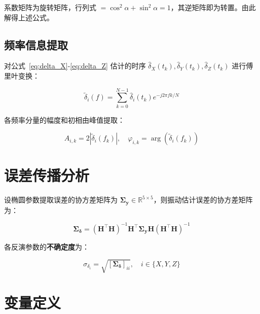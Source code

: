 \documentclass[12pt,a4paper]{article}
\begin{document}
系数矩阵为旋转矩阵，行列式 $= \cos^2\alpha + \sin^2\alpha = 1$，其逆矩阵即为转置。由此解得上述公式。

\subsection{频率信息提取}

对公式~\eqref{eq:delta_X}-\eqref{eq:delta_Z} 估计的时序 $\hat{\delta}_X(t_k), \hat{\delta}_Y(t_k), \hat{\delta}_Z(t_k)$ 进行傅里叶变换：

\begin{equation}
\tilde{\delta}_i(f) = \sum_{k=0}^{N-1} \hat{\delta}_i(t_k) e^{-j2\pi f k / N}
\label{eq:fourier_transform}
\end{equation}

各频率分量的幅度和初相由峰值提取：

\begin{equation}
A_{i,k} = 2|\tilde{\delta}_i(f_k)|, \quad
\varphi_{i,k} = \arg(\tilde{\delta}_i(f_k))
\label{eq:frequency_extraction}
\end{equation}

\section{误差传播分析}

设椭圆参数提取误差的协方差矩阵为 $\boldsymbol{\Sigma}_{\mathbf{y}} \in \mathbb{R}^{5 \times 5}$，则振动估计误差的协方差矩阵为：

\begin{equation}
\boldsymbol{\Sigma}_{\boldsymbol{\delta}} = (\mathbf{H}^{\top} \mathbf{H})^{-1} \mathbf{H}^{\top} \boldsymbol{\Sigma}_{\mathbf{y}} \mathbf{H} (\mathbf{H}^{\top} \mathbf{H})^{-1}
\label{eq:error_covariance}
\end{equation}

各反演参数的\textbf{不确定度}为：

\begin{equation}
\sigma_{\delta_i} = \sqrt{[\boldsymbol{\Sigma}_{\boldsymbol{\delta}}]_{ii}}, \quad i \in \{X, Y, Z\}
\label{eq:uncertainty}
\end{equation}

\section{变量定义}
\end{document}
